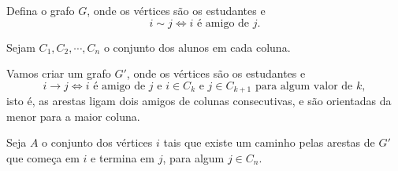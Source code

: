Defina o grafo $G$, onde os vértices são os estudantes e
$$ i \sim j \iff i \text{ é amigo de } j.$$

Sejam $C_1, C_2, \cdots, C_n$ o conjunto dos alunos em cada coluna.



Vamos criar um grafo $G'$, onde os vértices são os estudantes e
$$ i \to j \iff i \text{ é amigo de } j \text{ e } i \in C_k \text{ e } j \in C_{k+1} \text{ para algum valor de } k,$$
isto é, as arestas ligam dois amigos de colunas consecutivas, e são orientadas da menor para a maior coluna.

Seja $A$ o conjunto dos vértices $i$ tais que existe um caminho pelas arestas de $G'$ que começa em $i$ e termina em $j$, para algum $j \in C_n$.

